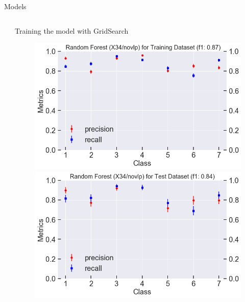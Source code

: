 \documentclass{if-beamer}
\begin{document}
\begin{frame}{Models}
\begin{columns}
\begin{column}{0.5\textwidth}
 \end{column} 
\begin{column}{0.5\textwidth}
  Training the model with GridSearch  
             \begin{figure}
            \includegraphics[scale=0.2]{./figs/rf_X34_train_score.png}
            \includegraphics[scale=0.2]{./figs/rf_X34_test_score.png}
            \end{figure}
 \end{column}
 \end{columns}
\end{frame}
\end{document}
